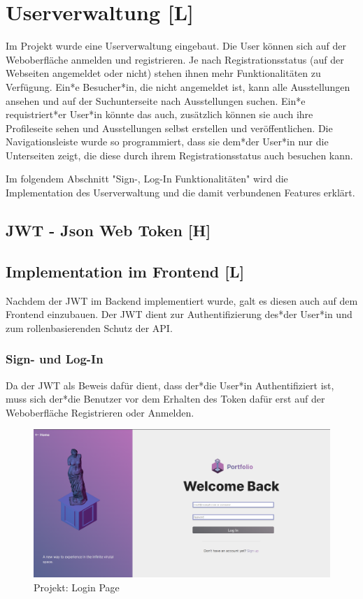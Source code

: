 \section{Userverwaltung [L]}
Im Projekt wurde eine Userverwaltung eingebaut. Die User können sich auf der Weboberfläche anmelden und registrieren. Je nach Registrationsstatus (auf der Webseiten angemeldet oder nicht) stehen ihnen mehr Funktionalitäten zu Verfügung. Ein*e Besucher*in, die nicht angemeldet ist, kann alle Ausstellungen ansehen und auf der Suchunterseite nach Ausstellungen suchen. Ein*e requistriert*er User*in könnte das auch, zusätzlich können sie auch ihre Profileseite sehen und Ausstellungen selbst erstellen und veröffentlichen. Die Navigationsleiste wurde so programmiert, dass sie dem*der User*in nur die Unterseiten zeigt, die diese durch ihrem Registrationsstatus auch besuchen kann. 

Im folgendem Abschnitt "Sign-, Log-In Funktionalitäten" wird die Implementation des Userverwaltung und die damit verbundenen Features erklärt. 

\subsection{JWT - Json Web Token [H]}
\subsection{Implementation im Frontend [L]}
Nachdem der JWT im Backend implementiert wurde, galt es diesen auch auf dem Frontend einzubauen. Der JWT dient zur Authentifizierung des*der User*in und zum rollenbasierenden Schutz der API. 

\subsubsection{Sign- und Log-In}
Da der JWT als Beweis dafür dient, dass der*die User*in Authentifiziert ist, muss sich der*die Benutzer vor dem Erhalten des Token dafür erst auf der Weboberfläche Registrieren oder Anmelden. 

\begin{figure}
    \centering
    \includegraphics[scale=0.25]{pics/GalleryLogIn.png}
    \caption{Projekt: Login Page}
    \label{fig:impl:login}
\end{figure}

